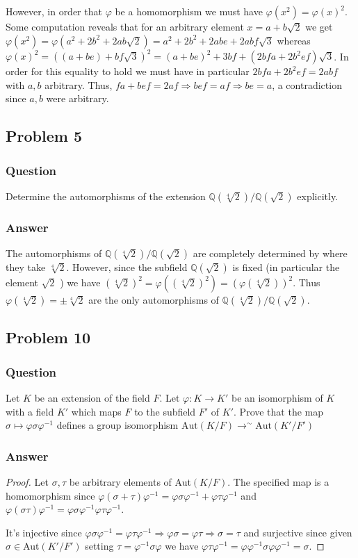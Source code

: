 \documentclass[10pt]{article}
\begin{document}
However, in order that $\varphi$ be a homomorphism we must have $\varphi(x^2)= \varphi(x)^2$. Some computation reveals that for an arbitrary element $x  = a +b\sqrt2$ we get $\varphi(x^2) = \varphi(a^2 + 2b^2+ 2ab\sqrt2)=a^2 + 2b^2+ 2ab e +2ab f \sqrt3  $ whereas $\varphi(x)^2 = ((a+be )+ bf\sqrt3)^2= (a+be)^2 +3bf + (2bfa+2b^2ef)\sqrt3 $. In order for this equality to hold we must have in particular $2bfa+2b^2ef = 2abf$ with $a,b$ arbitrary. Thus, $fa+bef = 2af \Rightarrow bef = af \Rightarrow be=a $, a contradiction since $a, b$ were arbitrary.

\subsection{Problem 5}
\subsubsection{Question}
Determine the automorphisms of the extension $\mathbb{Q}(\sqrt[4]2)/ \mathbb{Q}(\sqrt2)$ explicitly.
\subsubsection{Answer}
The automorphisms of  $\mathbb{Q}(\sqrt[4]2)/ \mathbb{Q}(\sqrt2)$  are completely determined by where they take $\sqrt[4]2$. However, since the subfield $\mathbb{Q}(\sqrt2)$ is fixed (in particular the element $\sqrt2$ ) we have $(\sqrt[4]2)^2= \varphi((\sqrt[4]2)^2)=(\varphi(\sqrt[4]2))^2$. Thus $\varphi(\sqrt[4]2) = \pm \sqrt[4]2$ are the only automorphisms of $\mathbb{Q}(\sqrt[4]2)/ \mathbb{Q}(\sqrt2)$.


\subsection{Problem 10}
\subsubsection{Question}
Let $K$ be an extension of the field $F$. Let $\varphi : K \to K'$ be an isomorphism of $K$ with a field $K'$ which maps $F$ to the subfield $F'$ of $K'$. Prove that the map $\sigma \mapsto \varphi \sigma \varphi^{-1}$ defines a group isomorphism $\mathrm{Aut}(K/ F) \to^{\sim} \mathrm{Aut}(K'/F')$
\subsubsection{Answer}
\begin{proof}
Let $\sigma, \tau$ be arbitrary elements of Aut$(K/F)$. The specified map is a homomorphism since $\varphi (\sigma + \tau ) \varphi^{-1} = \varphi \sigma \varphi^{-1}+ \varphi \tau \varphi^{-1}$ and $\varphi (\sigma \tau) \varphi^{-1} = \varphi \sigma \varphi^{-1} \varphi \tau \varphi^{-1}$. 

It's injective since $\varphi \sigma \varphi^{-1} = \varphi \tau \varphi^{-1} \Rightarrow \varphi \sigma = \varphi \tau \Rightarrow \sigma = \tau$ and surjective since given $\sigma \in $Aut$(K'/F')$ setting $\tau = \varphi^{-1}\sigma\varphi $ we have $\varphi \tau \varphi^{-1} = \varphi \varphi^{-1} \sigma  \varphi \varphi^{-1}= \sigma$.
\end{proof}
\end{document}
